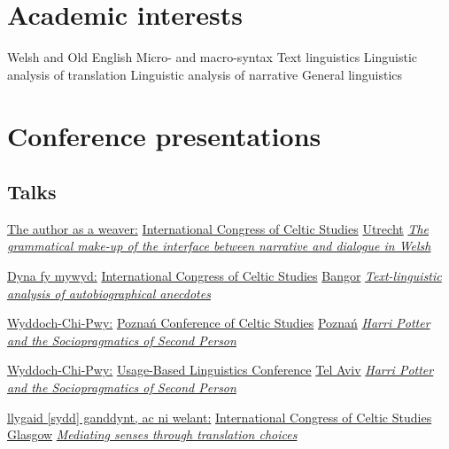 \section{Academic interests}
\cvlistdoubleitem
	{Welsh and Old English}
	{Micro- and macro-syntax}
\cvlistdoubleitem
	{Text linguistics}
	{Linguistic analysis of translation}
\cvlistdoubleitem
	{Linguistic analysis of narrative}
	{General linguistics}



\section{Conference presentations}

\subsection{Talks}

	{\href{https://ac.digitalwords.net/\#talks-2023-07-27}{The author as a weaver:}}
	{\href{https://celticstudiescongress.sites.uu.nl/}{ International Congress of Celtic Studies}}
	{\href{https://uu.nl/}{Utrecht}}
	{}
	{\href{https://ac.digitalwords.net/\#talks-2023-07-27}{\emph{The grammatical make-up of the interface between narrative and dialogue in Welsh}}}

	{\href{https://ac.digitalwords.net/\#talks-2019-07-22}{Dyna fy mywyd:}}
	{\href{http://celticcongress.bangor.ac.uk/}{ International Congress of Celtic Studies}}
	{\href{https://bangor.ac.uk/}{Bangor}}
	{}
	{\href{https://ac.digitalwords.net/\#talks-2019-07-22}{\emph{Text-linguistic analysis of autobiographical anecdotes}}}

	{\href{https://ac.digitalwords.net/\#talks-2018-07-10}{Wyddoch-Chi-Pwy:}}
	{\href{https://poznanconferenceblog.wordpress.com/}{ Poznań Conference of Celtic Studies}}
	{\href{https://amu.edu.pl/}{Poznań}}
	{}
	{\href{https://ac.digitalwords.net/\#talks-2018-07-10}{\emph{Harri Potter and the Sociopragmatics of Second Person}}}

	{\href{https://ac.digitalwords.net/\#talks-2018-07-03}{Wyddoch-Chi-Pwy:}}
	{\href{https://ubltlv18.wordpress.com/}{ Usage-Based Linguistics Conference}}
	{\href{https://tau.ac.il/}{Tel Aviv}}
	{}
	{\href{https://ac.digitalwords.net/\#talks-2018-07-03}{\emph{Harri Potter and the Sociopragmatics of Second Person}}}

	{\href{https://ac.digitalwords.net/\#talks-2015-07-14}{llygaid [sydd] ganddynt, ac ni welant:}}
	{\href{http://celticstudiescongress.org/}{ International Congress of Celtic Studies}}
	{\href{https://gla.ac.uk/}{Glasgow}}
	{}
	{\href{https://ac.digitalwords.net/\#talks-2015-07-14}{\emph{Mediating senses through translation choices}}}

